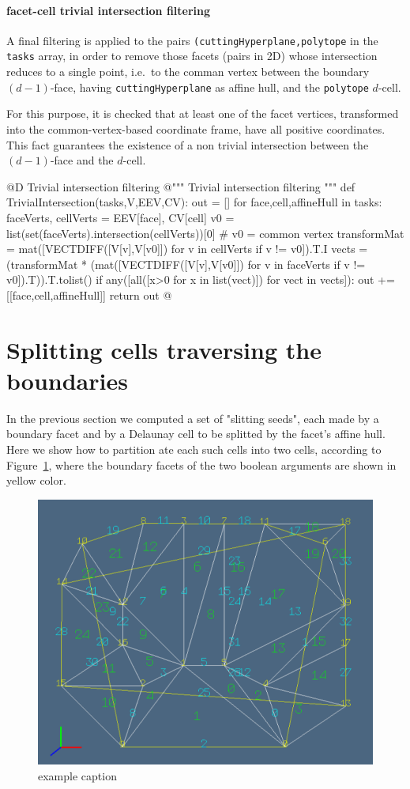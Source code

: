 \documentclass[11pt,oneside]{article}	%
\begin{document}
\paragraph{facet-cell trivial intersection filtering}

A final filtering is applied to the pairs \texttt{(cutting\-Hyper\-plane,polytope} in the \texttt{tasks} array, in order to remove those facets (pairs in 2D) whose intersection reduces to a single point, i.e.~to the comman vertex between the boundary $(d-1)$-face, having \texttt{cuttingHyperplane} as affine hull, and the \texttt{polytope} $d$-cell.

For this purpose, it is checked that at least one of the facet vertices, transformed into the common-vertex-based coordinate frame, have all positive coordinates. This fact guarantees the existence of a non trivial intersection between the $(d-1)$-face and the $d$-cell.

@D Trivial intersection filtering
@{""" Trivial intersection filtering """
def TrivialIntersection(tasks,V,EEV,CV):
	out = []
	for face,cell,affineHull in tasks:
		faceVerts, cellVerts = EEV[face], CV[cell]
		v0 = list(set(faceVerts).intersection(cellVerts))[0] # v0 = common vertex
		transformMat = mat([VECTDIFF([V[v],V[v0]]) for v in cellVerts if v != v0]).T.I
		vects = (transformMat * (mat([VECTDIFF([V[v],V[v0]]) for v in faceVerts 
					if v != v0]).T)).T.tolist()
		if any([all([x>0 for x in list(vect)]) for vect in vects]): 
			out += [[face,cell,affineHull]]
	return out
@}


\section{Splitting cells traversing the boundaries}

In the previous section we computed a set of "slitting seeds", each made by a boundary facet and by a Delaunay cell to be splitted by the facet's affine hull. Here we show how to partition ate each such cells into two cells, according to Figure~\ref{fig:splitting}, where the boundary facets of the two boolean arguments are shown in yellow color.

\begin{figure}[htbp] %
   \centering
   \includegraphics[width=0.6\linewidth]{images/splitting} 
   \caption{example caption}
   \label{fig:splitting}
\end{figure}
\end{document}
